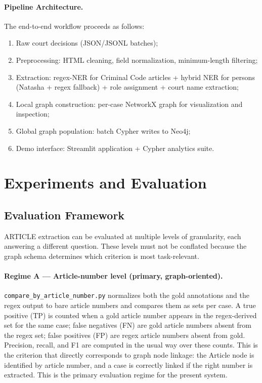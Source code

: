 \documentclass[11pt]{article}
\begin{document}
\paragraph{Pipeline Architecture.}

The end-to-end workflow proceeds as follows:
\begin{enumerate}
\item Raw court decisions (JSON/JSONL batches);
\item Preprocessing: HTML cleaning, field normalization, minimum-length filtering;
\item Extraction: regex-NER for Criminal Code articles + hybrid NER for persons (Natasha + regex fallback) + role assignment + court name extraction;
\item Local graph construction: per-case NetworkX graph for visualization and inspection;
\item Global graph population: batch Cypher writes to Neo4j;
\item Demo interface: Streamlit application + Cypher analytics suite.
\end{enumerate}

\section{Experiments and Evaluation}

\subsection{Evaluation Framework}

ARTICLE extraction can be evaluated at multiple levels of granularity, each answering a different question. These levels must not be conflated because the graph schema determines which criterion is most task-relevant.

\paragraph{Regime A --- Article-number level (primary, graph-oriented).}

\texttt{compare\_by\_article\_number.py} normalizes both the gold annotations and the regex output to bare article numbers and compares them as sets per case. A true positive (TP) is counted when a gold article number appears in the regex-derived set for the same case; false negatives (FN) are gold article numbers absent from the regex set; false positives (FP) are regex article numbers absent from gold. Precision, recall, and F1 are computed in the usual way over these counts. This is the criterion that directly corresponds to graph node linkage: the Article node is identified by article number, and a case is correctly linked if the right number is extracted. This is the primary evaluation regime for the present system.
\end{document}
